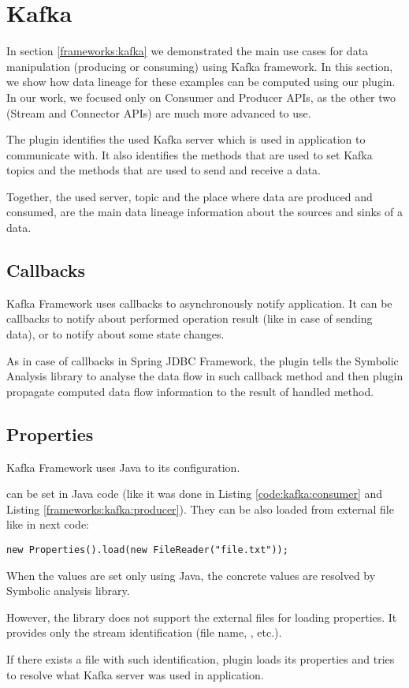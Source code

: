 \section{Kafka}

In section \ref{frameworks:kafka} we demonstrated the main use cases
for data manipulation (producing or consuming) using Kafka framework.
In this section, we show how data lineage for these examples can be computed
using our plugin. In our work, we focused only on Consumer and Producer APIs,
as the other two (Stream and Connector APIs) are much more advanced to use.

The plugin identifies the used Kafka server which is used in application to communicate with.
It also identifies the methods that are used to set Kafka topics
and the methods that are used to send and receive a data.

Together, the used server, topic and the place where data are produced and consumed,
are the main data lineage information about the sources and sinks of a data.




\subsection{Callbacks}

Kafka Framework uses callbacks to asynchronously notify application.
It can be callbacks to notify about performed operation result (like in case of sending data),
or to notify about some state changes.

As in case of callbacks in Spring JDBC Framework, the plugin tells
the Symbolic Analysis library to analyse the data flow in such callback method
and then plugin propagate computed data flow information 
to the result of handled method.




\subsection{Properties}

Kafka Framework uses Java  to its configuration.

 can be set in Java code (like it was done in
Listing \ref{code:kafka:consumer} and Listing \ref{frameworks:kafka:producer}).
They can be also loaded from external file like in next code:
\begin{lstlisting}[language=JavaSnippet]
        new Properties().load(new FileReader("file.txt"));
\end{lstlisting}

When the  values are set only using Java, the concrete
values are resolved by Symbolic analysis library.

However, the library does not support the external files for loading properties.
It provides only the stream identification (file name, , etc.).

If there exists a file with such identification, plugin loads its properties and
tries to resolve what Kafka server was used in application.


